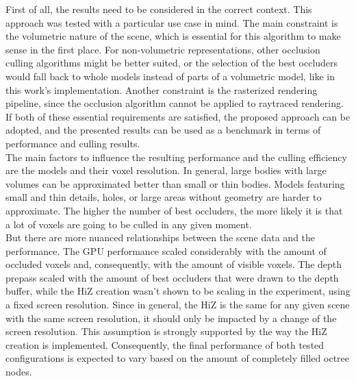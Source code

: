 \noindent
First of all, the results need to be considered in the correct context. This approach was tested with a particular use case 
in mind. The main constraint is the volumetric nature of the scene, which is essential for this algorithm to make sense in 
the first place. For non-volumetric representations, other occlusion culling algorithms might be better suited, or the 
selection of the best occluders would fall back to whole models instead of parts of a volumetric model, like in this work's 
implementation. Another constraint is the rasterized rendering pipeline, since the occlusion algorithm cannot be applied to 
raytraced rendering. If both of these essential requirements are satisfied, the proposed approach can be adopted, and the 
presented results can be used as a benchmark in terms of performance and culling results. \\

\noindent
The main factors to influence the resulting performance and the culling efficiency are the models and their voxel resolution.
In general, large bodies with large volumes can be approximated better than small or thin bodies. Models featuring small and 
thin details, holes, or large areas without geometry are harder to approximate. The higher the number of best occluders, the 
more likely it is that a lot of voxels are going to be culled in any given moment. \\

\noindent
But there are more nuanced relationships between the scene data and the performance. The \ac{GPU} performance scaled considerably 
with the amount of occluded voxels and, consequently, with the amount of visible voxels. The depth prepass scaled with the amount 
of best occluders that were drawn to the depth buffer, while the \ac{HiZ} creation wasn't shown to be scaling in the experiment, 
using a fixed screen resolution. Since in general, the \ac{HiZ} is the same for any given scene with the same screen resolution, 
it should only be impacted by a change of the screen resolution. This assumption is strongly supported by the way the \ac{HiZ} 
creation is implemented. Consequently, the final performance of both tested configurations is expected to vary based on the amount 
of completely filled octree nodes. \\

